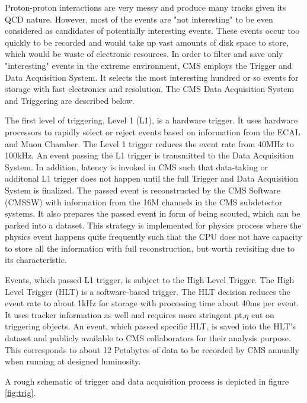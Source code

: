 Proton-proton interactions are very messy and produce many tracks given its QCD nature.
However, most of the events are "not interesting" to be even considered as candidates of potentially interesting events.
These events occur too quickly to be recorded and would take up vast amounts of disk space to store, which would be waste of electronic resources. 
In order to filter and save only "interesting" events in the extreme environment, CMS employs the Trigger and Data Acquisition System. 
It selects the most interesting hundred or so events for storage with fast electronics and resolution.
The CMS Data Acquisition System and Triggering are described below.

The first level of triggering, Level 1 (L1), is a hardware trigger.
It uses hardware processors to rapidly select or reject events based on information from the ECAL and Muon Chamber. 
The Level 1 trigger reduces the event rate from 40MHz to 100kHz.
An event passing the L1 trigger is transmitted to the Data Acquisition System.
In addition, latency is invoked in CMS such that data-taking or additonal L1 trigger does not happen until the full Trigger and Data Acquisition System is finalized.
The passed event is reconstructed by the CMS Software (CMSSW) with information from the 16M channels in the CMS subdetector systems.
It also prepares the passed event in form of being scouted, which can be parked into a dataset.
This strategy is implemented for physics process where the physics event happens quite frequently such that the CPU does not have capacity to store all the information with full reconstruction, but worth revisiting due to its characteristic. 

Events, which passed L1 trigger, is subject to the High Level Trigger. 
The High Level Trigger (HLT) is a software-based trigger. 
The HLT decision reduces the event rate to about 1kHz for storage with processing time about 40ms per event.
It uses tracker information as well and requires more stringent pt,$\eta$ cut on triggering objects. 
An event, which passed specific HLT, is saved into the HLT's dataset and publicly available to CMS collaborators for their analysis purpose.
This corresponds to about 12 Petabytes of data to be recorded by CMS annually when running at designed luminosity. 

A rough schematic of trigger and data acquisition process is depicted in figure \ref{fig:trig}.
